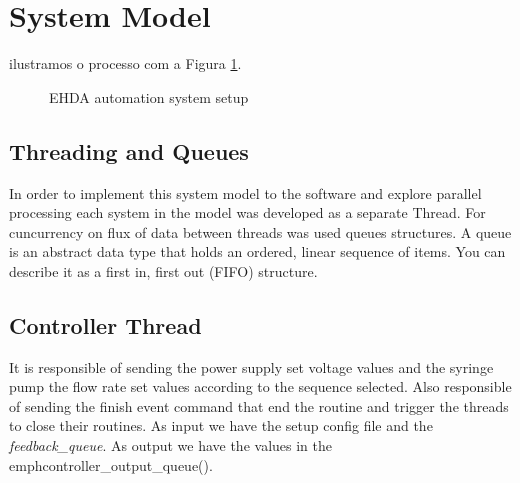 \section{System Model}
\label{sec:control_model}

ilustramos o processo com a Figura \ref{fig:control_model_fig}. 

\begin{figure}[H]
  \centering
  \caption{EHDA automation system setup}
  \label{fig:control_model_fig}
\end{figure}

\subsection{Threading and Queues}
\label{subsec:concurrency}

    In order to implement this system model to the software and explore parallel processing each system in the
    model was developed as a separate Thread.
    For cuncurrency on flux of data between threads was used queues structures.
    A queue is an abstract data type that holds an ordered, linear sequence of items. You can describe it as a first in, first out (FIFO) structure.

    
    \subsection{Controller Thread}

        It is responsible of sending the power supply set voltage values and the syringe pump the flow rate set values according to the sequence selected.
        Also responsible of sending the finish event command that end the routine and trigger the threads to close their routines.
        As input we have the setup config file and the \emph{feedback\_queue}. As output we have the values in the emph{controller\_output\_queue()}.

